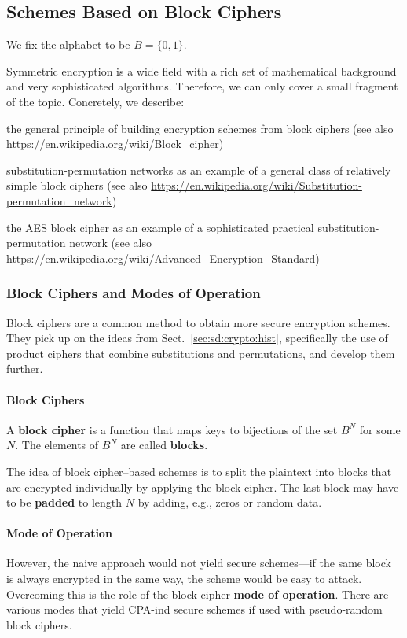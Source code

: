 \subsection{Schemes Based on Block Ciphers}

We fix the alphabet to be $B=\{0,1\}$.

Symmetric encryption is a wide field with a rich set of mathematical background and very sophisticated algorithms.
Therefore, we can only cover a small fragment of the topic.
Concretely, we describe:
\begin{compactitem}
 \item the general principle of building encryption schemes from block ciphers
 (see also \url{https://en.wikipedia.org/wiki/Block_cipher})
 \item substitution-permutation networks as an example of a general class of relatively simple block ciphers
 (see also \url{https://en.wikipedia.org/wiki/Substitution-permutation_network})
 \item the AES block cipher as an example of a sophisticated practical substitution-permutation network
 (see also \url{https://en.wikipedia.org/wiki/Advanced_Encryption_Standard})
\end{compactitem}

\subsubsection{Block Ciphers and Modes of Operation}

Block ciphers are a common method to obtain more secure encryption schemes.
They pick up on the ideas from Sect.~\ref{sec:sd:crypto:hist}, specifically the use of product ciphers that combine substitutions and permutations, and develop them further.

\paragraph{Block Ciphers}
A \textbf{block cipher} is a function that maps keys to bijections of the set $B^N$ for some $N$.
The elements of $B^N$ are called \textbf{blocks}.

The idea of block cipher--based schemes is to split the plaintext into blocks that are encrypted individually by applying the block cipher.
The last block may have to be \textbf{padded} to length $N$ by adding, e.g., zeros or random data.

\paragraph{Mode of Operation}
However, the naive approach would not yield secure schemes---if the same block is always encrypted in the same way, the scheme would be easy to attack.
Overcoming this is the role of the block cipher \textbf{mode of operation}.
There are various modes that yield CPA-ind secure schemes if used with pseudo-random block ciphers.

